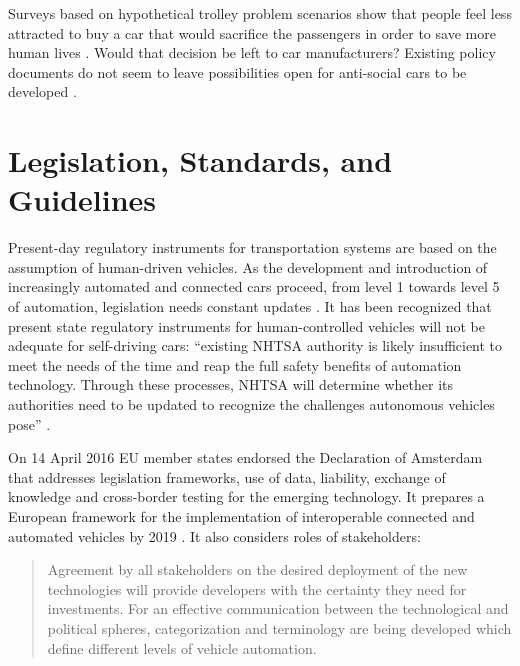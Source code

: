 Surveys based on hypothetical trolley problem scenarios show that people feel less attracted to buy a car that would sacrifice the passengers in order to save more human lives \cite{Bonnefon2016}. Would that decision be left to car manufacturers? Existing policy documents do not seem to leave possibilities open for anti-social cars to be developed \cite{EthicsCommission2017pr,EthicsCommission2017b,Pillath2016,NHTSA2016PolicyUpdate,DBLP:journals/corr/CharisiDFLMSSWY17} .


\section{Legislation, Standards, and Guidelines}
\label{sec:LegislationStandardGuidelines}

Present-day regulatory instruments for transportation systems are based on the assumption of human-driven vehicles. As the development and introduction of increasingly automated and connected cars proceed, from level 1 towards level 5 of automation, legislation needs constant updates \cite{EthicsCommission2017pr,EthicsCommission2017b,Pillath2016,NHTSA2016PolicyUpdate}. It has been recognized that present state regulatory instruments for human-controlled vehicles will not be adequate for self-driving cars:  \enquote{existing NHTSA authority is likely insufficient to meet the needs of the time and reap the full safety benefits of automation technology. Through these processes, NHTSA will determine whether its authorities need to be updated to recognize the challenges autonomous vehicles pose} \cite{NHTSA2016PolicyUpdate}. %

On 14 April 2016 EU member states endorsed the Declaration of Amsterdam \cite{GovernmentNL2017} that addresses legislation frameworks, use of data, liability, exchange of knowledge and cross-border testing for the emerging technology. It prepares a European framework for the implementation of interoperable connected and automated vehicles by 2019 \cite{EthicsCommission2017b}. It also considers roles of stakeholders:

 \begin{quote}
 Agreement by all stakeholders on the desired deployment of the new technologies will provide developers with the certainty they need for investments. For an effective communication between the technological and political spheres, categorization and terminology are being developed which define different levels of vehicle automation. \cite{Pillath2016} %
 \end{quote} %
 
